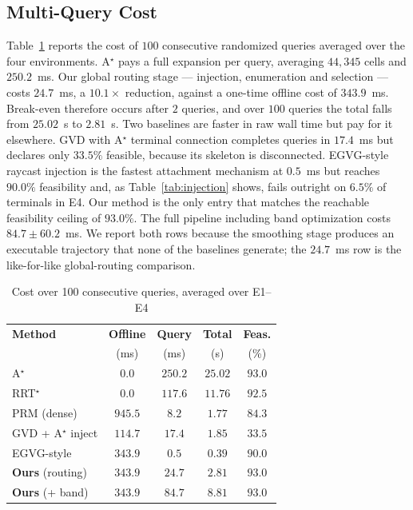\documentclass[conference]{IEEEtran}
\begin{document}
\subsection{Multi-Query Cost}
Table~\ref{tab:compute_benchmarks} reports the cost of $100$ consecutive randomized queries averaged over the four environments. A$^\star$ pays a full expansion per query, averaging $44{,}345$ cells and $250.2$~ms. Our global routing stage --- injection, enumeration and selection --- costs $24.7$~ms, a $10.1\times$ reduction, against a one-time offline cost of $343.9$~ms. Break-even therefore occurs after $2$ queries, and over $100$ queries the total falls from $25.02$~s to $2.81$~s.
Two baselines are faster in raw wall time but pay for it elsewhere. GVD with A$^\star$ terminal connection completes queries in $17.4$~ms but declares only $33.5\%$ feasible, because its skeleton is disconnected. EGVG-style raycast injection is the fastest attachment mechanism at $0.5$~ms but reaches $90.0\%$ feasibility and, as Table~\ref{tab:injection} shows, fails outright on $6.5\%$ of terminals in E4. Our method is the only entry that matches the reachable feasibility ceiling of $93.0\%$.
The full pipeline including band optimization costs $84.7\pm60.2$~ms. We report both rows because the smoothing stage produces an executable trajectory that none of the baselines generate; the $24.7$~ms row is the like-for-like global-routing comparison.
\begin{table}[htbp]
\caption{Cost over 100 consecutive queries, averaged over E1--E4}
\label{tab:compute_benchmarks}
\begin{center}
\begin{tabular}{@{}lcccc@{}}
\toprule
\textbf{Method} & \textbf{Offline} & \textbf{Query} & \textbf{Total} & \textbf{Feas.} \\
 & (ms) & (ms) & (s) & (\%) \\ \midrule
A$^\star$ & $0.0$ & $250.2$ & $25.02$ & $93.0$ \\
RRT$^\star$ & $0.0$ & $117.6$ & $11.76$ & $92.5$ \\
PRM (dense) & $945.5$ & $8.2$ & $1.77$ & $84.3$ \\
GVD + A$^\star$ inject & $114.7$ & $17.4$ & $1.85$ & $33.5$ \\
EGVG-style~\cite{qi2025egvg} & $343.9$ & $0.5$ & $0.39$ & $90.0$ \\ \midrule
\textbf{Ours} (routing) & $\mathbf{343.9}$ & $\mathbf{24.7}$ & $\mathbf{2.81}$ & $\mathbf{93.0}$ \\
\textbf{Ours} (+ band) & $343.9$ & $84.7$ & $8.81$ & $93.0$ \\ \bottomrule
\end{tabular}
\end{center}
\end{table}
\end{document}
